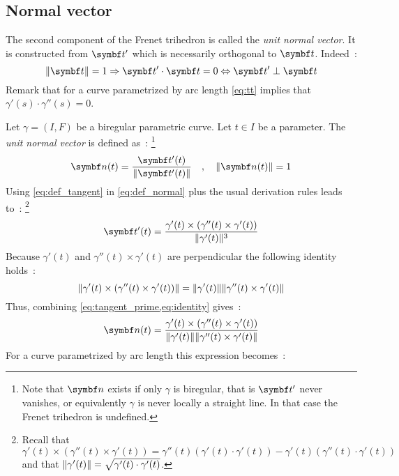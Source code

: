\subsection{Normal vector}
The second component of the Frenet trihedron is called the \emph{unit normal vector}. It is constructed from $\vect{t}'$ which is necessarily orthogonal to $\vect{t}$. Indeed~:
\begin{equation}
	\norm{\vect{t}}=1 \Rightarrow \vect{t}' \cdot  \vect{t} = 0 \Leftrightarrow  \vect{t}' \perp \vect{t}
	\label{eq:tt}
\end{equation}
Remark that for a curve parametrized by arc length \cref{eq:tt} implies that $\gamma'(s) \cdot \gamma''(s) = 0$.

Let $\gamma = (I,F)$ be a biregular parametric curve. Let $t \in I$ be a parameter. The \emph{unit normal vector} is defined as~: \footnote{Note that $\vect{n}$ exists if only $\gamma$ is biregular, that is $\vect{t}'$ never vanishes, or equivalently $\gamma$ is never locally a straight line. In that case the Frenet trihedron is undefined.}
\begin{equation}
	\vect{n}(t) = \frac{\vect{t}'(t)}{\norm{\vect{t}'(t)}} 
	\quad,\quad
	\norm{\vect{n}(t)}=1
	\label{eq:def_normal}
\end{equation}
Using \cref{eq:def_tangent} in \cref{eq:def_normal} plus the usual derivation rules leads to~: \footnote{Recall that $\gamma'(t) \times (\gamma''(t) \times \gamma'(t)) = \gamma''(t) (\gamma'(t) \cdot \gamma'(t)) - \gamma'(t) (\gamma''(t) \cdot \gamma'(t))$ and that $\lVert\gamma'(t)\rVert = \sqrt{\gamma'(t) \cdot \gamma'(t)}$.}
\begin{equation}
	\vect{t}'(t) = \frac{\gamma'(t) \times (\gamma''(t) \times \gamma'(t))}{\norm{\gamma'(t)}^3}
	\label{eq:tangent_prime}
\end{equation}
Because $\gamma'(t)$ and $\gamma''(t) \times \gamma'(t)$ are perpendicular the following identity holds~:
\begin{equation}
	\norm{\gamma'(t) \times (\gamma''(t) \times \gamma'(t))} = \norm{\gamma'(t)}\norm{\gamma''(t) \times \gamma'(t)}
	\label{eq:identity}
\end{equation}
Thus, combining \cref{eq:tangent_prime,eq:identity} gives~:
\begin{equation}
	\vect{n}(t) = \frac{\gamma'(t) \times (\gamma''(t) \times \gamma'(t))}{\norm{\gamma'(t)}\norm{\gamma''(t) \times \gamma'(t)}}
	\label{eq:def2_normal}
\end{equation}
For a curve parametrized by arc length this expression becomes~:
